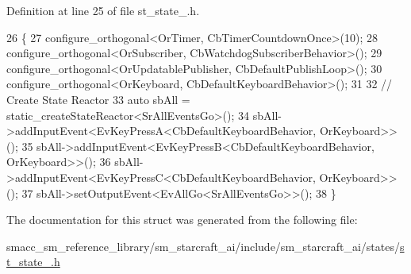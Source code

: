 Definition at line 25 of file st\+\_\+state\+\_.\+h.


\begin{DoxyCode}
26     \{
27         configure\_orthogonal<OrTimer, CbTimerCountdownOnce>(10);
28         configure\_orthogonal<OrSubscriber, CbWatchdogSubscriberBehavior>();
29         configure\_orthogonal<OrUpdatablePublisher, CbDefaultPublishLoop>();
30         configure\_orthogonal<OrKeyboard, CbDefaultKeyboardBehavior>();
31 
32         \textcolor{comment}{// Create State Reactor}
33         \textcolor{keyword}{auto} sbAll = static\_createStateReactor<SrAllEventsGo>();
34         sbAll->addInputEvent<EvKeyPressA<CbDefaultKeyboardBehavior, OrKeyboard>>();
35         sbAll->addInputEvent<EvKeyPressB<CbDefaultKeyboardBehavior, OrKeyboard>>();
36         sbAll->addInputEvent<EvKeyPressC<CbDefaultKeyboardBehavior, OrKeyboard>>();
37         sbAll->setOutputEvent<EvAllGo<SrAllEventsGo>>();
38     \}
\end{DoxyCode}


The documentation for this struct was generated from the following file\+:\begin{DoxyCompactItemize}
\item 
smacc\+\_\+sm\+\_\+reference\+\_\+library/sm\+\_\+starcraft\+\_\+ai/include/sm\+\_\+starcraft\+\_\+ai/states/\hyperlink{sm__starcraft__ai_2include_2sm__starcraft__ai_2states_2st__state__2_8h}{st\+\_\+state\+\_.\+h}\end{DoxyCompactItemize}
